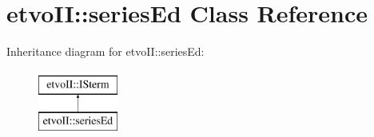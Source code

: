 \hypertarget{classetvo_i_i_1_1series_ed}{}\section{etvo\+II\+:\+:series\+Ed Class Reference}
\label{classetvo_i_i_1_1series_ed}
Inheritance diagram for etvo\+II\+:\+:series\+Ed\+:\begin{figure}[H]
\begin{center}
\leavevmode
\includegraphics[height=2.000000cm]{classetvo_i_i_1_1series_ed}
\end{center}
\end{figure}
